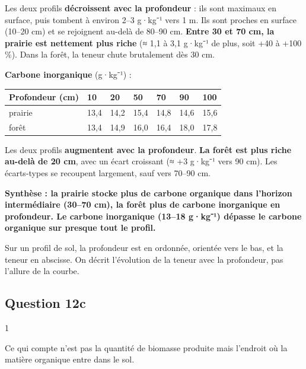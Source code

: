 \documentclass[11pt,a4paper]{article}
\begin{document}
Les deux profils \textbf{décroissent avec la profondeur} : ils sont maximaux en surface, puis tombent à environ 2--3 g·kg⁻¹ vers 1 m. Ils sont proches en surface (10--20 cm) et se rejoignent au-delà de 80--90 cm. \textbf{Entre 30 et 70 cm, la prairie est nettement plus riche} (≈ 1,1 à 3,1 g·kg⁻¹ de plus, soit +40 à +100 \%). Dans la forêt, la teneur chute brutalement dès 30 cm.

\textbf{Carbone inorganique} (g·kg⁻¹) :

\begin{longtable}[]{@{}lllllll@{}}
\toprule\noalign{}
Profondeur (cm) & 10 & 20 & 50 & 70 & 90 & 100 \\
\midrule\noalign{}
\endhead
\bottomrule\noalign{}
\endlastfoot
prairie & 13,4 & 14,2 & 15,4 & 14,8 & 14,6 & 15,6 \\
forêt & 13,4 & 14,9 & 16,0 & 16,4 & 18,0 & 17,8 \\
\end{longtable}

Les deux profils \textbf{augmentent avec la profondeur}. \textbf{La forêt est plus riche au-delà de 20 cm}, avec un écart croissant (≈ +3 g·kg⁻¹ vers 90 cm). Les écarts-types se recoupent largement, sauf vers 70--90 cm.

\textbf{Synthèse : la prairie stocke plus de carbone organique dans l'horizon intermédiaire (30--70 cm), la forêt plus de carbone inorganique en profondeur. Le carbone inorganique (13--18 g·kg⁻¹) dépasse le carbone organique sur presque tout le profil.}

\begin{piege}

Sur un profil de sol, la profondeur est en ordonnée, orientée vers le bas, et la teneur en abscisse. On décrit l'évolution de la teneur avec la profondeur, pas l'allure de la courbe.

\end{piege}

\hypertarget{question-12c}{%
\subsection{Question 12c}\label{question-12c}}

\begin{indication}{1}

Ce qui compte n'est pas la quantité de biomasse produite mais l'endroit où la matière organique entre dans le sol.

\end{indication}
\end{document}

